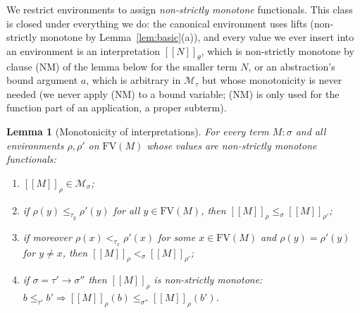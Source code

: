 \documentclass{amsart}
\newtheorem{lemma}{Lemma}
\theoremstyle{definition}
\newcommand{\interp}[1]{[\![#1]\!]}
\newcommand{\FV}{\mathrm{FV}}
\begin{document}
We restrict environments to assign \emph{non-strictly monotone} functionals. This class is
closed under everything we do: the canonical environment uses lifts (non-strictly monotone
by Lemma~\ref{lem:basic}(a)), and every value we ever insert into an environment is an
interpretation $\interp{N}_\theta$, which is non-strictly monotone by clause (NM) of the
lemma below for the smaller term $N$, or an abstraction's bound argument $a$, which is
arbitrary in $\mathcal M_\tau$ but whose monotonicity is never needed (we never apply (NM)
to a bound variable; (NM) is only used for the function part of an application, a proper
subterm).

\begin{lemma}[Monotonicity of interpretations]\label{lem:official}
For every term $M:\sigma$ and all environments $\rho,\rho'$ on $\FV(M)$ \emph{whose values
are non-strictly monotone functionals}:
\begin{enumerate}
\item[\textup{(M0)}] $\interp{M}_\rho\in\mathcal M_\sigma$;
\item[\textup{(M$\le$)}] if $\rho(y)\le_{\tau_y}\rho'(y)$ for all $y\in\FV(M)$, then
  $\interp{M}_\rho\le_\sigma\interp{M}_{\rho'}$;
\item[\textup{(M$<$)}] if moreover $\rho(x)<_{\tau_x}\rho'(x)$ for some $x\in\FV(M)$ and
  $\rho(y)=\rho'(y)$ for $y\ne x$, then $\interp{M}_\rho<_\sigma\interp{M}_{\rho'}$;
\item[\textup{(NM)}] if $\sigma=\tau'\to\sigma''$ then $\interp{M}_\rho$ is non-strictly
  monotone: $b\le_{\tau'}b'\Rightarrow\interp{M}_\rho(b)\le_{\sigma''}\interp{M}_\rho(b')$.
\end{enumerate}
\end{lemma}
\end{document}
